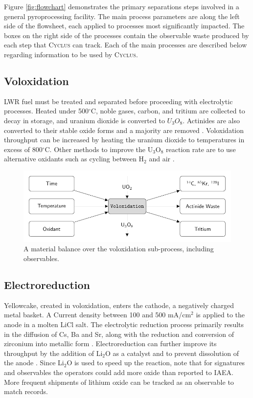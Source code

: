 \documentclass{anstrans}
\newcommand{\Cyclus}{\textsc{Cyclus}\xspace}%
\begin{document}
Figure \ref{fig:flowchart} demonstrates the primary separations steps involved in a general pyroprocessing facility. The main process 
parameters are along the left side of the flowsheet, each applied to processes most significantly impacted. The boxes on the 
right side of the processes contain the observable waste produced by each step that \Cyclus can track. Each of the main processes 
are described below regarding information to be used by \Cyclus.

\subsection{Voloxidation}

LWR fuel must be treated and separated before proceeding with electrolytic processes. Heated under 
500$^{\circ}$C, noble gases, carbon, and tritium are collected to decay in storage, and uranium dioxide is converted to $U_3O_8$. 
Actinides are also converted to their stable oxide forms and a majority are removed \cite{flowsheet_1998,jubin_spent_2009}. 
Voloxidation throughput can be increased by heating the uranium dioxide to temperatures in excess of 800$^{\circ}$C. 
Other methods to improve the U$_3$O$_8$ reaction rate are to use alternative oxidants such as cycling between H$_2$ and air \cite{jubin_spent_2009}.

\begin{figure}[ht]
	\centering
	\includegraphics[width=1\linewidth]{volox}
	\caption{A material balance over the voloxidation sub-process, including observables.}
	\label{fig:volox}
\end{figure}

\subsection{Electroreduction}

Yellowcake, created in voloxidation, enters the cathode, a negatively charged metal basket. A Current density between 100 and 
500 mA/cm$^2$ 
is applied to the anode in a molten LiCl salt. The electrolytic reduction process primarily results in the diffusion of 
Cs, Ba and Sr, along with the reduction and conversion of zirconium into metallic form \cite{choi_electrochemical_2015,flowsheet_1998}.
Electroreduction can further improve its throughput by the addition of Li$_2$O as a catalyst and to prevent dissolution 
of the anode \cite{choi_electrochemical_2015}. Since Li$_2$O is used to speed up the reaction, note 
that for signatures and observables the operators could add more oxide than reported to IAEA. More frequent shipments 
of lithium oxide can be tracked as an observable to match records.
\end{document}
